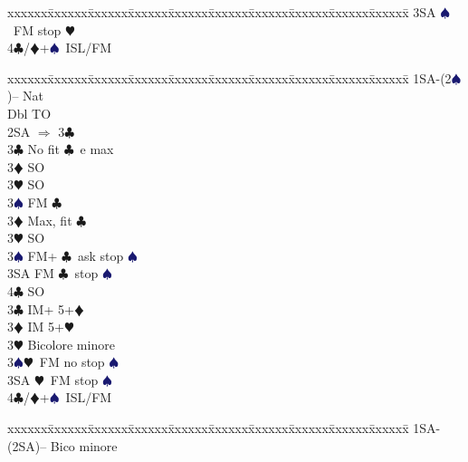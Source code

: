 \documentclass[a4paper,italian]{article}
\newcommand{\BC}{\textcolor{OliveGreen}{$\clubsuit$}}
\newcommand{\BD}{\textcolor{RedOrange}{$\vardiamondsuit$}}
\newcommand{\BH}{\textcolor{Red2}{$\varheartsuit${}}}
\newcommand{\BS}{\textcolor{MidnightBlue}{$\spadesuit${}}}
\newenvironment{bidtable}
{\begin{tabbing}

    xxxxxx\=xxxxxx\=xxxxxx\=xxxxxx\=xxxxxx\=xxxxxx\=xxxxxx\=xxxxxx\=xxxxxx\=xxxxxx\=\kill}
{\end{tabbing} }%
\begin{document}
\begin{multicols}{2}
\begin{bidtable}
                                            3SA \BS\ FM stop \BH \\
                                            4\BC/\BD {}+\BS\ ISL/FM\-
                                        \end{bidtable}
                                        \bigbreak
                                        \begin{bidtable}
                                            1SA-(2\BS)-- \> \> Nat\+\\
                                            Dbl \> TO\\
                                            2SA \> $\Rightarrow$ 3\BC \+\\
                                            3\BC \> No fit \BC\ e max\+\\
                                            3\BD \> SO\\
                                            3\BH \> SO\\
                                            3\BS \> FM \BC \-\\
                                            3\BD \> Max, fit \BC \+\\
                                            3\BH \> SO\\
                                            3\BS \> FM+ \BC\ ask stop \BS \\
                                            3SA \> FM \BC\ stop \BS \\
                                            4\BC \> SO\-\-\\
                                            3\BC \> IM+ 5+\BD \\
                                            3\BD \> IM 5+\BH \\
                                            3\BH \> Bicolore minore\\
                                            3\BS {}\BH\ FM no stop \BS \\
                                            3SA \BH\ FM stop \BS \\
                                            4\BC/\BD {}+\BS\ ISL/FM\-
                                        \end{bidtable}
                                        \bigbreak
                                        \begin{bidtable}
                                            1SA-(2SA)-- \>\> Bico minore\+\\

\end{bidtable}
\end{multicols}
\end{document}
